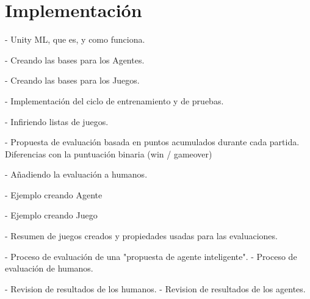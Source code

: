 \chapter{Implementación}\label{chapter:implementation}

- Unity ML, que es, y como funciona.

- Creando las bases para los Agentes.

- Creando las bases para los Juegos.


- Implementación del ciclo de entrenamiento y de pruebas.

- Infiriendo listas de juegos.

- Propuesta de evaluación basada en puntos acumulados durante cada partida. Diferencias con la puntuación binaria (win / gameover)

- Añadiendo la evaluación a humanos.

- Ejemplo creando Agente 

- Ejemplo creando Juego

- Resumen de juegos creados y propiedades usadas para las evaluaciones.

- Proceso de evaluación de una "propuesta de agente inteligente".
- Proceso de evaluación de humanos.
 
- Revision de resultados de los humanos.
- Revision de resultados de los agentes.
